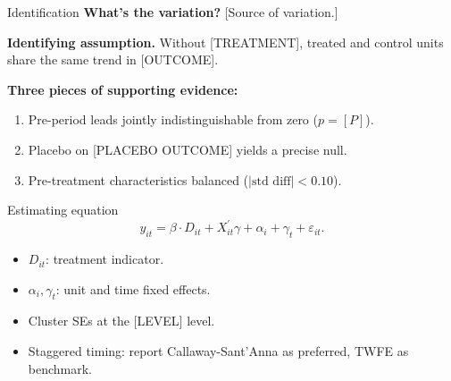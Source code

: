 
\begin{frame}{Identification}
  \textbf{What's the variation?} [Source of variation.]

  \medskip
  \textbf{Identifying assumption.} Without [TREATMENT], treated
  and control units share the same trend in [OUTCOME].

  \medskip
  \textbf{Three pieces of supporting evidence:}
  \begin{enumerate}
    \item Pre-period leads jointly indistinguishable from zero
          ($p = [P]$).
    \item Placebo on [PLACEBO OUTCOME] yields a precise null.
    \item Pre-treatment characteristics balanced
          ($|\text{std diff}| < 0.10$).
  \end{enumerate}
\end{frame}

\begin{frame}{Estimating equation}
  \begin{equation*}
    y_{it} = \beta \cdot D_{it} + X_{it}^{\prime}\gamma
           + \alpha_i + \gamma_t + \varepsilon_{it}.
  \end{equation*}

  \begin{itemize}
    \item $D_{it}$: treatment indicator.
    \item $\alpha_i, \gamma_t$: unit and time fixed effects.
    \item Cluster SEs at the [LEVEL] level.
    \item Staggered timing: report Callaway-Sant'Anna as
          preferred, TWFE as benchmark.
  \end{itemize}
\end{frame}

